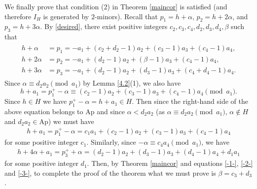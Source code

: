 \documentclass[12pt]{amsart}
\numberwithin{equation}{section}
\theoremstyle{definition}
\newcommand{\Ap}{\mathrm{Ap}}
\begin{document}
We finally prove that condition (2) in Theorem \ref{maincor} is satisfied (and therefore $I_H$ is generated by $2$-minors).
Recall that $p_1=h+\alpha$, $p_2=h+2\alpha $, and $p_3=h+3\alpha$.
By \eqref{desired},
there exist positive integers
$c_2,c_3,c_4,d_2,d_3,d_4,\beta$ such that
\begin{align}
\label{-1-}
\begin{array}{ll}
h+\alpha&= p_1 =-a_1+ (c_2+d_2-1)a_2+(c_3-1)a_3+(c_4-1)a_4,\\
h+2\alpha&= p_2 = -a_1+ (d_2-1)a_2+(\beta-1) a_3+(c_4-1)a_4,\\
h+3\alpha&=  p_3 =-a_1+ (d_2-1)a_2+(d_3-1)a_3+(c_4+d_4-1)a_4.
\end{array}
\end{align}
Since $\alpha\equiv d_2a_2 \pmod {a_1}$ by Lemma \ref{4.2}(1),
we also have
\[
h+a_1=p_1^+-\alpha \equiv (c_2-1)a_2+(c_3-1)a_3+(c_4-1)a_4 \pmod {a_1}.
\]
Since $h \in H$ we have $p_1^+-\alpha=h+a_1 \in H$.
Then since the right-hand side of the above equation belongs to $\Ap$
and since $\alpha<d_2a_2$ (as $\alpha\equiv d_2a_2 \pmod {a_1}$, $\alpha \not \in H$ and $d_2a_2 \in \Ap$) we must have
\begin{align}
\label{-2-}
h+a_1=p_1^+-\alpha = c_1 a_1 +(c_2-1)a_2+(c_3-1)a_3+(c_4-1)a_4
\end{align}
for some positive integer $c_1$.
Similarly,
since $-\alpha \equiv c_4a_4 \pmod{a_1}$, we have
\begin{align}
    \label{-3-}
h+4\alpha+a_1=p^+_3+\alpha =(d_2-1)a_2+(d_3-1)a_3+(d_4-1)a_4+d_1a_1\end{align}
for some positive integer $d_1$.
Then, by Theorem \ref{maincor} and equations \eqref{-1-}, \eqref{-2-} and \eqref{-3-},
to complete the proof of the theorem
what we must prove is $\beta=c_3+d_3$.
\end{document}
